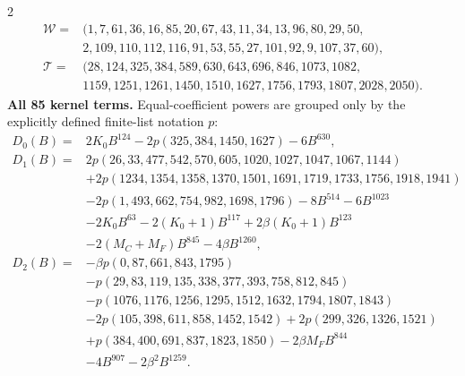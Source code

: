 \documentclass[10pt]{article}
\begin{document}
\begin{multicols}{2}
\[\begin{aligned}
\mathcal W={}&(1,7,61,36,16,85,20,67,43,11,34,13,96,80,29,50,\\
 &2,109,110,112,116,91,53,55,27,101,92,9,107,37,60),\\
\mathcal T={}&(28,124,325,384,589,630,643,696,846,1073,1082,\\
 &1159,1251,1261,1450,1510,1627,1756,1793,1807,2028,2050).
\end{aligned}
\]
\textbf{All 85 kernel terms.} Equal-coefficient powers are grouped only by
the explicitly defined finite-list notation $p$:
\[
\begin{aligned}
D_0(B)={}&2K_0B^{124}-2p(325,384,1450,1627)-6B^{630},\\
D_1(B)={}&2p(26,33,477,542,570,605,1020,1027,1047,1067,1144)\\
 &+2p(1234,1354,1358,1370,1501,1691,1719,1733,1756,1918,1941)\\
 &-2p(1,493,662,754,982,1698,1796)-8B^{514}-6B^{1023}\\
 &-2K_0B^{63}-2(K_0+1)B^{117}+2\beta(K_0+1)B^{123}\\
 &-2(M_C+M_F)B^{845}-4\beta B^{1260},\\
D_2(B)={}&-\beta p(0,87,661,843,1795)\\
 &-p(29,83,119,135,338,377,393,758,812,845)\\
 &-p(1076,1176,1256,1295,1512,1632,1794,1807,1843)\\
 &-2p(105,398,611,858,1452,1542)+2p(299,326,1326,1521)\\
 &+p(384,400,691,837,1823,1850)-2\beta M_FB^{844}\\
 &-4B^{907}-2\beta^2B^{1259}.
\end{aligned}
\]


\end{multicols}
\end{document}
